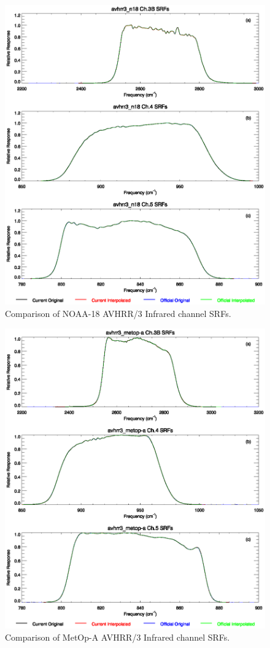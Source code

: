 \begin{figure}[htp]
  \centering
  \includegraphics[scale=1]{graphics/nominal/avhrr3_n18.srf.eps}
  \caption{Comparison of NOAA-18 AVHRR/3 Infrared channel SRFs.}
  \label{fig:avhrr3_n18}
\end{figure}

\begin{figure}[htp]
  \centering
  \includegraphics[scale=1]{graphics/nominal/avhrr3_metop-a.srf.eps}
  \caption{Comparison of MetOp-A AVHRR/3 Infrared channel SRFs.}
  \label{fig:avhrr3_metop-a}
\end{figure}

